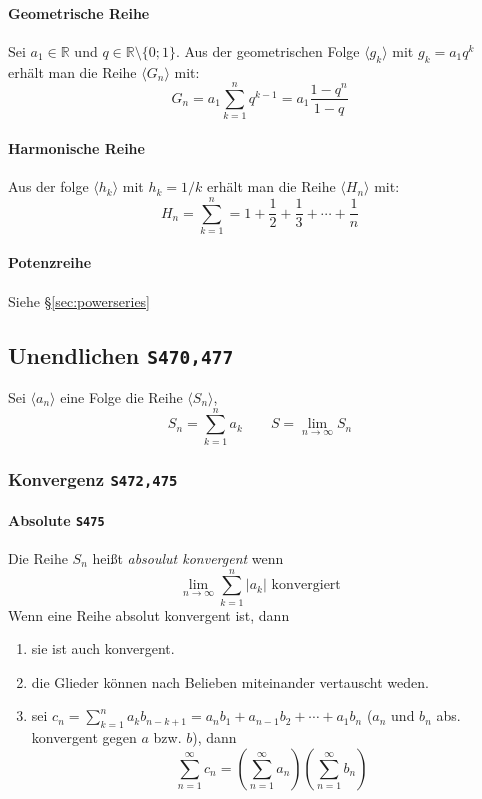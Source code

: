 \documentclass[a4paper, twocolumn]{article}
\numberwithin{equation}{subsection}
\newcommand{\brpage}[1]{\textcolor{red!70!black}{\small\texttt{S#1}}}
\begin{document}
\paragraph{Geometrische Reihe}
Sei \(a_1 \in \mathbb{R}\) und \(q \in \mathbb{R} \setminus \{0;1\}\). Aus der geometrischen Folge \(\langle g_k \rangle\) mit \(g_k = a_1 q^k\) erh\"alt man die Reihe \(\langle G_n \rangle\) mit:
\[
    G_n = a_1 \sum_{k=1}^n q^{k-1} = a_1 \frac{1-q^n}{1-q}
\]
    
\paragraph{Harmonische Reihe}
Aus der folge \(\langle h_k \rangle\) mit \(h_k = 1/k\) erh\"alt man die Reihe \(\langle H_n \rangle\) mit:
\[
    H_n = \sum_{k=1}^n = 1 + \frac{1}{2} + \frac{1}{3} + \cdots + \frac{1}{n}
\]

\paragraph{Potenzreihe} Siehe \S\ref{sec:powerseries}

\subsection{Unendlichen \brpage{470,477}}
Sei \(\langle a_n \rangle\) eine Folge die Reihe \(\langle S_n \rangle\),
\[
    S_n = \sum_{k=1}^n a_k \qquad S = \lim_{n\to\infty} S_n
\]

\subsubsection{Konvergenz \brpage{472,475}}

\paragraph{Absolute \brpage{475}}
Die Reihe \(S_n\) hei{\ss}t \emph{absoulut konvergent} wenn
\[
    \lim_{n\to\infty} \sum_{k=1}^n \left| a_k \right| \text{ konvergiert}
\]
Wenn eine Reihe absolut konvergent ist, dann
\begin{enumerate}
    \item sie ist auch konvergent.
    \item die Glieder k\"onnen nach Belieben miteinander vertauscht weden.
    \item sei \(\displaystyle 
        c_n = \sum_{k=1}^n a_k b_{n-k+1} = a_n b_1 + a_{n-1} b_2 + \cdots + a_1 b_n
    \) (\(a_n\) und \(b_n\) abs. konvergent gegen \(a\) bzw. \(b\)), dann
    \[
        \sum_{n=1}^\infty c_n = 
        \left(\sum_{n=1}^\infty a_n\right)
        \left(\sum_{n=1}^\infty b_n\right)
    \]
\end{enumerate}
\end{document}
